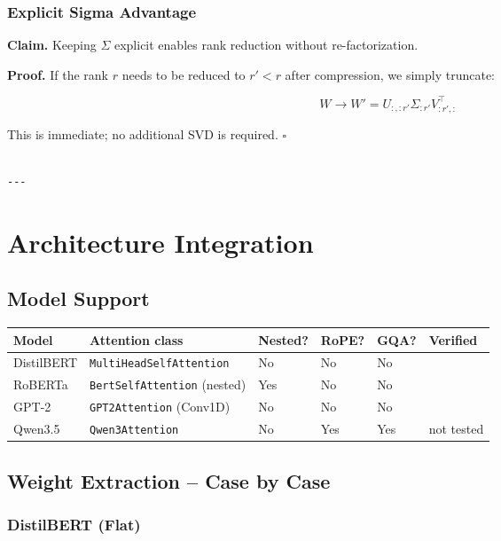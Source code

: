 \subsubsection{Explicit Sigma Advantage}

\textbf{Claim.} Keeping $\Sigma$ explicit enables rank reduction without 
re-factorization.

\textbf{Proof.} If the rank $r$ needs to be reduced to $r' < r$ after 
compression, we simply truncate:

\[
W \to W' = U_{:, :r'} \Sigma_{:r'} V_{:r', :}^\top
\]

This is immediate; no additional SVD is required. $\square$
\begin{lstlisting}

---
\end{lstlisting}


\section{Architecture Integration}

\subsection{Model Support}

\begin{table}[H]
\centering
\small
\begin{tabular}{llllll}
\toprule
\textbf{Model} & \textbf{Attention class} & \textbf{Nested?} & \textbf{RoPE?} & \textbf{GQA?} & \textbf{Verified} \\
\midrule
DistilBERT & \texttt{MultiHeadSelfAttention} & No & No & No &  \\
RoBERTa & \texttt{BertSelfAttention} (nested) & Yes & No & No &  \\
GPT-2 & \texttt{GPT2Attention} (Conv1D) & No & No & No &  \\
Qwen3.5 & \texttt{Qwen3Attention} & No & Yes & Yes & not tested \\
\bottomrule
\end{tabular}
\end{table}

\subsection{Weight Extraction -- Case by Case}

\subsubsection{DistilBERT (Flat)}


